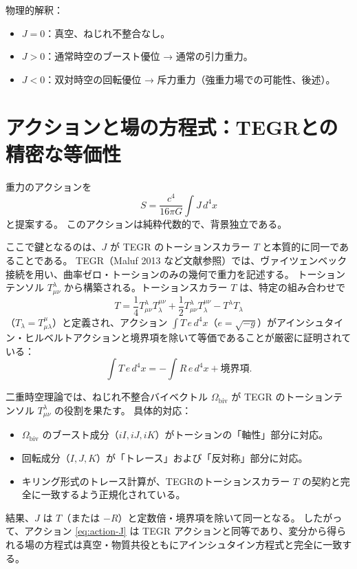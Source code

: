 \documentclass[dvipdfmx,a4paper]{jsbook}
\theoremstyle{definition}
\theoremstyle{remark}
\begin{document}
物理的解釈：
\begin{itemize}
  \item $J = 0$：真空、ねじれ不整合なし。
  \item $J > 0$：通常時空のブースト優位 → 通常の引力重力。
  \item $J < 0$：双対時空の回転優位 → 斥力重力（強重力場での可能性、後述）。
\end{itemize}

\section{アクションと場の方程式：TEGRとの精密な等価性}
\label{sec:action-tegr-equivalence}

重力のアクションを
\begin{equation}
  S = \frac{c^4}{16\pi G} \int J \, d^4x
  \label{eq:action-J}
\end{equation}
と提案する。  
このアクションは純粋代数的で、背景独立である。  

ここで鍵となるのは、$J$ が TEGR のトーションスカラー $T$ と本質的に同一であることである。  
TEGR（Maluf 2013 など文献参照）では、ヴァイツェンベック接続を用い、曲率ゼロ・トーションのみの幾何で重力を記述する。  
トーションテンソル $T^\lambda_{\mu\nu}$ から構築される。トーションスカラー $T$ は、特定の組み合わせで
\begin{equation}
  T = \frac{1}{4} T^\lambda_{\mu\nu} T_\lambda^{\mu\nu} + \frac{1}{2} T^\lambda_{\mu\nu} T^{\mu\nu}_\lambda - T^\lambda T_\lambda
  \label{eq:tegr-T}
\end{equation}
（$T_\lambda = T^\mu_{\mu\lambda}$）と定義され、アクション $\int T \, e \, d^4x$（$e = \sqrt{-g}$）がアインシュタイン・ヒルベルトアクションと境界項を除いて等価であることが厳密に証明されている：
\begin{equation}
  \int T \, e \, d^4x = -\int R \, e \, d^4x + \text{境界項}.
\end{equation}

二重時空理論では、ねじれ不整合バイベクトル $\Omega_\text{biv}$ が TEGR のトーションテンソル $T^\lambda_{\mu\nu}$ の役割を果たす。  
具体的対応：
\begin{itemize}
  \item $\Omega_\text{biv}$ のブースト成分（$iI, iJ, iK$）がトーションの「軸性」部分に対応。
  \item 回転成分（$I, J, K$）が「トレース」および「反対称」部分に対応。
  \item キリング形式のトレース計算が、TEGRのトーションスカラー $T$ の契約と完全に一致するよう正規化されている。
\end{itemize}
結果、$J$ は $T$（または $-R$）と定数倍・境界項を除いて同一となる。  
したがって、アクション \eqref{eq:action-J} は TEGR アクションと同等であり、変分から得られる場の方程式は真空・物質共役ともにアインシュタイン方程式と完全に一致する。  
\end{document}
